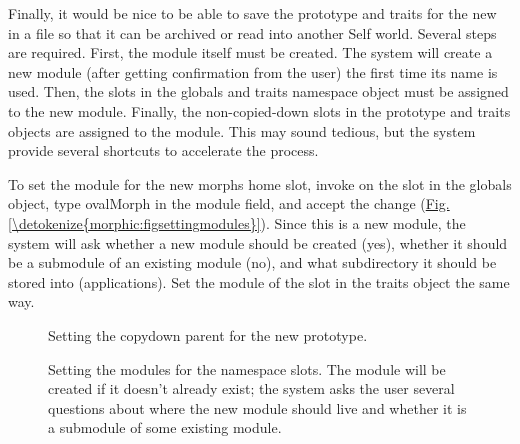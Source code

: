 \documentclass[letterpaper,10pt,english]{sphinxmanual}
\begin{document}
Finally, it would be nice to be able to save the prototype and traits for the new  in a file so that it can be archived or read into another Self world. Several steps are required. First, the module itself must be created. The system will create a new module (after getting confirmation from the user) the first time its name is used. Then, the slots in the globals and traits namespace object must be assigned to the new module. Finally, the non-copied-down slots in the prototype and traits objects are assigned to the module. This may sound tedious, but the system provide several shortcuts to accelerate the process.

To set the module for the new morphs home slot, invoke  on the  slot in the globals object, type \sphinxquotedblleft{}ovalMorph\sphinxquotedblright{} in the module field, and accept the change (\hyperref[\detokenize{morphic:figsettingmodules}]{Fig.\@ \ref{\detokenize{morphic:figsettingmodules}}}). Since this is a new module, the system will ask whether a new module should be created (yes), whether it should be a submodule of an existing module (no), and what subdirectory it should be stored into (\sphinxquotedblleft{}applications\sphinxquotedblright{}). Set the module of the  slot in the traits object the same way.
\begin{figure}[htbp]
\centering
\capstart

\noindent{}
\caption{Setting the copydown parent for the new prototype.}\label{\detokenize{morphic:figsettingcopydown}}\label{\detokenize{morphic:id12}}\end{figure}
\begin{figure}[htbp]
\centering
\capstart

\noindent{}
\caption{Setting the modules for the namespace slots. The module will be created if it doesn't already exist; the system asks the user several questions about where the new module should live and whether it is a submodule of some existing module.}\label{\detokenize{morphic:figsettingmodules}}\label{\detokenize{morphic:id13}}\end{figure}
\end{document}
